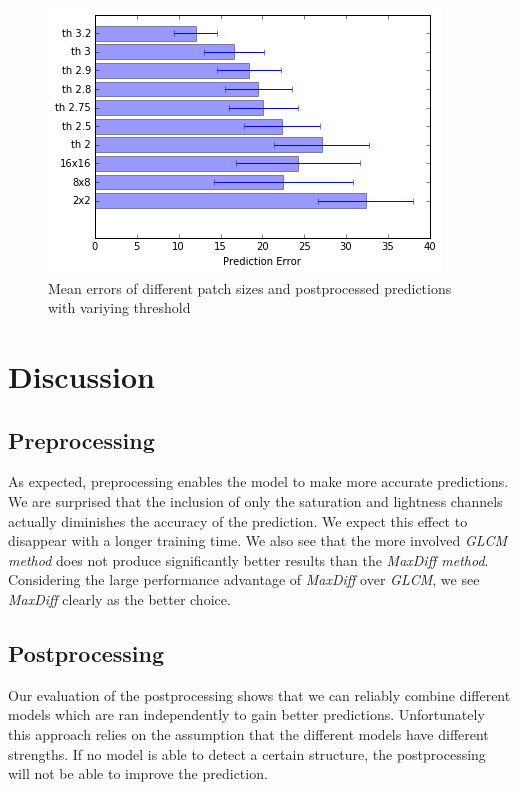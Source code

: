 \documentclass[10pt,conference,compsocconf]{IEEEtran}
\begin{document}
\begin{figure}
	\centering
	\includegraphics[width=.8\columnwidth]{pictures/postprocessing}
	\caption{Mean errors of different patch sizes and postprocessed predictions with variying threshold}
	\label{fig:postprocessing}
\end{figure}


\section{Discussion}

\subsection{Preprocessing}

As expected, preprocessing enables the model to make more accurate predictions.
We are surprised that the inclusion of only the saturation and lightness channels actually diminishes the accuracy of the prediction.
We expect this effect to disappear with a longer training time.
We also see that the more involved \emph{GLCM method} does not produce significantly better results than the \emph{MaxDiff method}.
Considering the large performance advantage of \emph{MaxDiff} over \emph{GLCM}, we see \emph{MaxDiff} clearly as the better choice.

\subsection{Postprocessing}

Our evaluation of the postprocessing shows that we can reliably combine different models which are ran independently to gain better predictions. Unfortunately this approach relies on the assumption that the different models have different strengths. If no model is able to detect a certain structure, the postprocessing will not be able to improve the prediction. %
\end{document}
